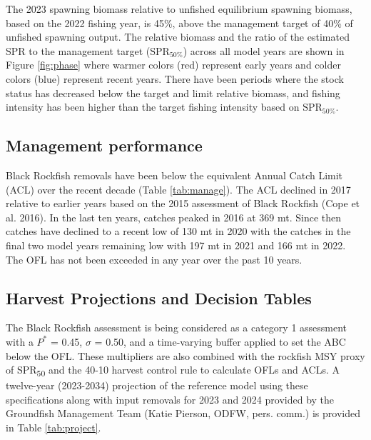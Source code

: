 \documentclass[11pt,
  english,
  letterpaper,
]{article}
\begin{document}
The 2023 spawning biomass relative to unfished equilibrium spawning biomass, based on the 2022 fishing year, is 45\%, above the management target of 40\% of unfished spawning output. The relative biomass and the ratio of the estimated SPR to the management target (\(\text{SPR}_{50\%}\)) across all model years are shown in Figure \ref{fig:phase} where warmer colors (red) represent early years and colder colors (blue) represent recent years. There have been periods where the stock status has decreased below the target and limit relative biomass, and fishing intensity has been higher than the target fishing intensity based on \(\text{SPR}_{50\%}\).

\hypertarget{management-performance-1}{%
\subsection{Management performance}\label{management-performance-1}}

Black Rockfish removals have been below the equivalent Annual Catch Limit (ACL) over the recent decade (Table \ref{tab:manage}). The ACL declined in 2017 relative to earlier years based on the 2015 assessment of Black Rockfish (Cope et al. 2016). In the last ten years, catches peaked in 2016 at 369 mt. Since then catches have declined to a recent low of 130 mt in 2020 with the catches in the final two model years remaining low with 197 mt in 2021 and 166 mt in 2022. The OFL has not been exceeded in any year over the past 10 years.

\hypertarget{harvest-projections-and-decision-tables}{%
\subsection{Harvest Projections and Decision Tables}\label{harvest-projections-and-decision-tables}}

The Black Rockfish assessment is being considered as a category 1 assessment with a \(P^*\) = 0.45, \(\sigma\) = 0.50, and a time-varying buffer applied to set the ABC below the OFL. These multipliers are also combined with the rockfish MSY proxy of SPR\textsubscript{50} and the 40-10 harvest control rule to calculate OFLs and ACLs. A twelve-year (2023-2034) projection of the reference model using these specifications along with input removals for 2023 and 2024 provided by the Groundfish Management Team (Katie Pierson, ODFW, pers. comm.) is provided in Table \ref{tab:project}.
\end{document}
